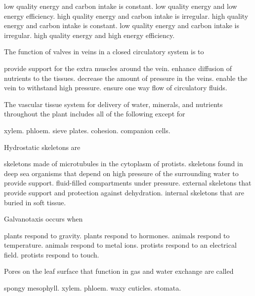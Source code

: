 \begin{choices}
\choice low quality energy and carbon intake is constant. 
\choice low quality energy and low energy efficiency.
\choice high quality energy and carbon intake is irregular. 
\choice high quality energy and carbon intake is constant. 
\correctchoice low quality energy and carbon intake is irregular.
\choice high quality energy and high energy efficiency. 
\end{choices}

\question
The function of valves in veins in a closed circulatory system is to 
\begin{choices}
\choice provide support for the extra muscles around the vein. 
\choice enhance diffusion of nutrients to the tissues. 
\choice decrease the amount of pressure in the veins.  
\choice enable the vein to withstand high pressure. 
\correctchoice ensure one way flow of circulatory fluids. 
\end{choices}

\question
The vascular tissue system for delivery of water, minerals, and nutrients throughout the plant includes all of the following except for

\begin{choices}
\choice xylem. 
\choice phloem. 
\choice sieve plates. 
\correctchoice cohesion. 
\choice companion cells. 
\end{choices}

\question
Hydrostatic skeletons are 

\begin{choices}
\choice skeletons made of microtubules in the cytoplasm of protists. 
\choice skeletons found in deep sea organisms that depend on high pressure of the surrounding water to provide support. 
\correctchoice fluid-filled compartments under pressure. 
\choice external skeletons that provide support and protection against dehydration. 
\choice internal skeletons that are buried in soft tissue.  
\end{choices}

\question
Galvanotaxis occurs when 

\begin{choices}
\choice plants respond to gravity.  
\choice plants respond to hormones. 
\choice animals respond to temperature. 
\choice animals respond to metal ions. 
\correctchoice protists respond to an electrical field. 
\choice protists respond to touch. 
\end{choices}

\newpage

\question
Pores on the leaf surface that function in gas and water exchange are called

\begin{choices}
\choice spongy mesophyll. 
\choice xylem. 
\choice phloem. 
\choice waxy cuticles. 
\correctchoice stomata. 
\end{choices}
